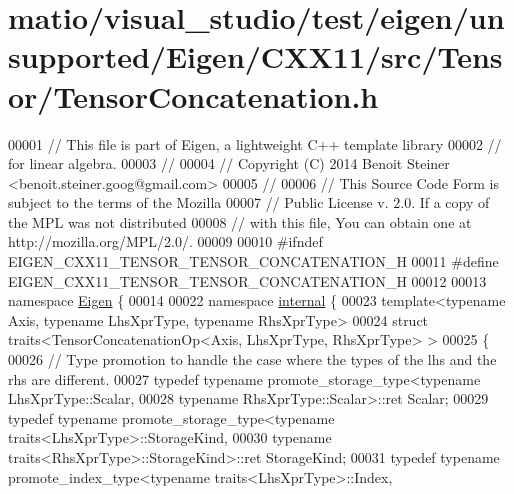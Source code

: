 \hypertarget{matio_2visual__studio_2test_2eigen_2unsupported_2_eigen_2_c_x_x11_2src_2_tensor_2_tensor_concatenation_8h_source}{}\section{matio/visual\+\_\+studio/test/eigen/unsupported/\+Eigen/\+C\+X\+X11/src/\+Tensor/\+Tensor\+Concatenation.h}
\label{matio_2visual__studio_2test_2eigen_2unsupported_2_eigen_2_c_x_x11_2src_2_tensor_2_tensor_concatenation_8h_source}

\begin{DoxyCode}
00001 \textcolor{comment}{// This file is part of Eigen, a lightweight C++ template library}
00002 \textcolor{comment}{// for linear algebra.}
00003 \textcolor{comment}{//}
00004 \textcolor{comment}{// Copyright (C) 2014 Benoit Steiner <benoit.steiner.goog@gmail.com>}
00005 \textcolor{comment}{//}
00006 \textcolor{comment}{// This Source Code Form is subject to the terms of the Mozilla}
00007 \textcolor{comment}{// Public License v. 2.0. If a copy of the MPL was not distributed}
00008 \textcolor{comment}{// with this file, You can obtain one at http://mozilla.org/MPL/2.0/.}
00009 
00010 \textcolor{preprocessor}{#ifndef EIGEN\_CXX11\_TENSOR\_TENSOR\_CONCATENATION\_H}
00011 \textcolor{preprocessor}{#define EIGEN\_CXX11\_TENSOR\_TENSOR\_CONCATENATION\_H}
00012 
00013 \textcolor{keyword}{namespace }\hyperlink{namespace_eigen}{Eigen} \{
00014 
00022 \textcolor{keyword}{namespace }\hyperlink{namespaceinternal}{internal} \{
00023 \textcolor{keyword}{template}<\textcolor{keyword}{typename} Axis, \textcolor{keyword}{typename} LhsXprType, \textcolor{keyword}{typename} RhsXprType>
00024 \textcolor{keyword}{struct }traits<TensorConcatenationOp<Axis, LhsXprType, RhsXprType> >
00025 \{
00026   \textcolor{comment}{// Type promotion to handle the case where the types of the lhs and the rhs are different.}
00027   \textcolor{keyword}{typedef} \textcolor{keyword}{typename} promote\_storage\_type<\textcolor{keyword}{typename} LhsXprType::Scalar,
00028                                         \textcolor{keyword}{typename} RhsXprType::Scalar>::ret Scalar;
00029   \textcolor{keyword}{typedef} \textcolor{keyword}{typename} promote\_storage\_type<typename traits<LhsXprType>::StorageKind,
00030                                         \textcolor{keyword}{typename} traits<RhsXprType>::StorageKind>::ret StorageKind;
00031   \textcolor{keyword}{typedef} \textcolor{keyword}{typename} promote\_index\_type<typename traits<LhsXprType>::Index,

\end{DoxyCode}
